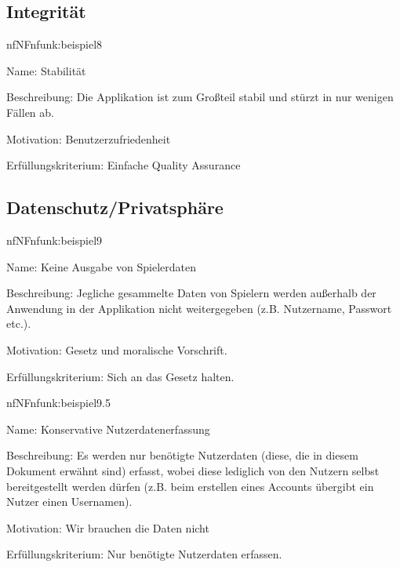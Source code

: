 \subsection{Integrität}

\begin{description}[leftmargin=5em, style=sameline]	
	\begin{lhp}{nf}{NF}{nfunk:beispiel8}
		\item [Name:] Stabilität %
		\item [Beschreibung:] Die Applikation ist zum Großteil stabil und stürzt in nur wenigen Fällen ab. %
		\item [Motivation:] Benutzerzufriedenheit %
		\item [Erfüllungskriterium:] Einfache Quality Assurance %
	\end{lhp}
\end{description}

\subsection{Datenschutz/Privatsphäre}

\begin{description}[leftmargin=5em, style=sameline]	
	\begin{lhp}{nf}{NF}{nfunk:beispiel9}
		\item [Name:] Keine Ausgabe von Spielerdaten %
		\item [Beschreibung:] Jegliche gesammelte Daten von Spielern werden außerhalb der Anwendung in der Applikation nicht weitergegeben (z.B. Nutzername, Passwort etc.). %
		\item [Motivation:] Gesetz und moralische Vorschrift. %
		\item [Erfüllungskriterium:] Sich an das Gesetz halten. %
	\end{lhp}
\end{description}

\begin{description}[leftmargin=5em, style=sameline]	
	\begin{lhp}{nf}{NF}{nfunk:beispiel9.5}
		\item [Name:] Konservative Nutzerdatenerfassung %
		\item [Beschreibung:] Es werden nur benötigte Nutzerdaten (diese, die in diesem Dokument erwähnt sind) erfasst, wobei diese lediglich von den Nutzern selbst bereitgestellt werden dürfen (z.B. beim erstellen eines Accounts übergibt ein Nutzer einen Usernamen). %
		\item [Motivation:] Wir brauchen die Daten nicht %
		\item [Erfüllungskriterium:] Nur benötigte Nutzerdaten erfassen.
	\end{lhp}
\end{description}


